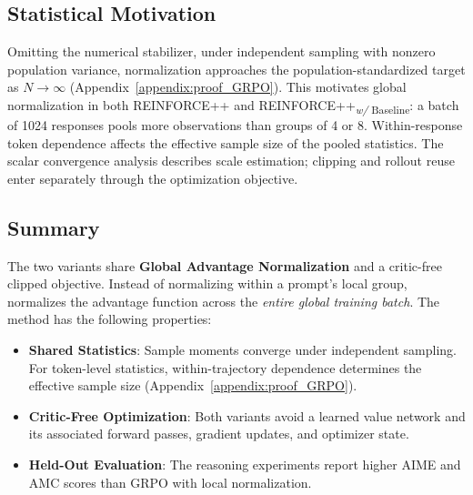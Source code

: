 \subsection{Statistical Motivation} \label{appendix:whyglobal}

Omitting the numerical stabilizer, under independent sampling with nonzero population variance, normalization approaches the population-standardized target as $N\to\infty$ (Appendix~\ref{appendix:proof_GRPO}). This motivates global normalization in both \textsc{REINFORCE++} and \textsc{REINFORCE++}\textsubscript{\textit{w/} Baseline}: a batch of 1024 responses pools more observations than groups of 4 or 8. Within-response token dependence affects the effective sample size of the pooled statistics. The scalar convergence analysis describes scale estimation; clipping and rollout reuse enter separately through the optimization objective.

\subsection{Summary}

The two variants share \textbf{Global Advantage Normalization} and a critic-free clipped objective. Instead of normalizing within a prompt's local group, \ours normalizes the advantage function across the \textit{entire global training batch}. The method has the following properties:
\begin{itemize}
    \item \textbf{Shared Statistics}: Sample moments converge under independent sampling. For token-level statistics, within-trajectory dependence determines the effective sample size (Appendix~\ref{appendix:proof_GRPO}).
    \item \textbf{Critic-Free Optimization}: Both variants avoid a learned value network and its associated forward passes, gradient updates, and optimizer state.
    \item \textbf{Held-Out Evaluation}: The reasoning experiments report higher AIME and AMC scores than GRPO with local normalization.
\end{itemize}

